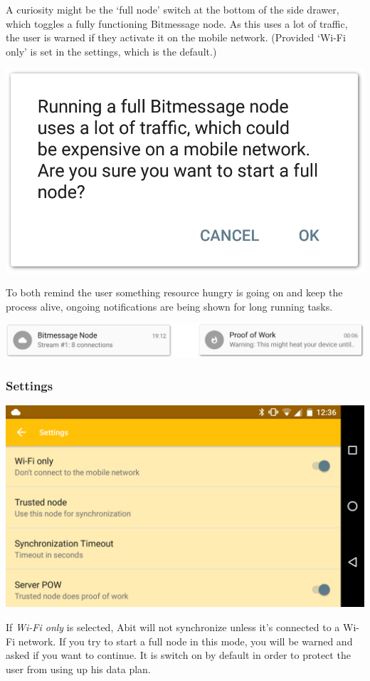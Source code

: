 \documentclass{bfh}
\begin{document}
  A curiosity might be the `full node' switch at the bottom of the side drawer, which toggles a fully functioning Bitmessage node. As this uses a lot of traffic, the user is warned if they activate it on the mobile network. (Provided `Wi-Fi only' is set in the settings, which is the default.)

  \begin{center}
    \includegraphics[width=0.4 \textwidth]{images/screenshots/warning_dialog.png}
  \end{center}

  To both remind the user something resource hungry is going on and keep the process alive, ongoing notifications are being shown for long running tasks.

  \begin{center}
    \includegraphics[width=0.8 \textwidth]{images/screenshots/ongoing_notifications.png}
  \end{center}

  \subsubsection{Settings}

  \begin{center}
    \includegraphics[width=0.8 \textwidth]{images/screenshots/settings.png}
  \end{center}

  If \textit{Wi-Fi only} is selected, Abit will not synchronize unless it's connected to a Wi-Fi network. If you try to start a full node in this mode, you will be warned and asked if you want to continue. It is switch on by default in order to protect the user from using up his data plan.
\end{document}
